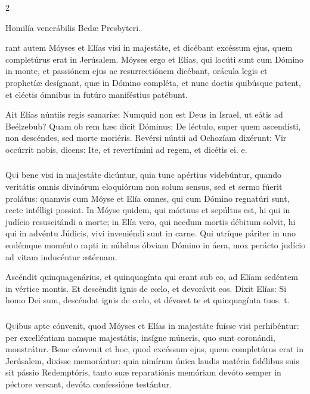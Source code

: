 \documentclass[9pt,twoside]{extarticle}
\begin{document}
\begin{multicols}{2}
\begin{center}Homilía venerábilis Bedæ Presbyteri.\end{center}
rant autem Móyses et Elías visi in majestáte, et dicébant excéssum ejus, quem completúrus erat in Jerúsalem. Móyses ergo et Elías, qui locúti sunt cum Dómino in monte, et passiónem ejus ac resurrectiónem dicébant, orácula legis et prophetíæ desígnant, quæ in Dómino compléta, et nunc doctis quibúsque patent, et eléctis ómnibus in futúro maniféstius patébunt.

\begin{tightlist}{}
\item {} Ait Elías núntiis regis samaríæ: Numquid non est Deus in Israel, ut eátis ad Beélzebub? Quam ob rem hæc dicit Dóminus: \textred{*} De léctulo, super quem ascendísti, non descéndes, sed morte moriéris.  Revérsi núntii ad Ochozíam dixérunt: Vir occúrrit nobis, dicens: Ite, et revertímini ad regem, et dicétis ei. e.
\end{tightlist}

\subsubsection*{\center {}}
\lettrine{Q}ui bene visi in majestáte dicúntur, quia tunc apértius videbúntur, quando veritátis omnis divinórum eloquiórum non solum sensus, sed et sermo fúerit prolátus: quamvis cum Móyse et Elía omnes, qui cum Dómino regnatúri sunt, recte intélligi possint. In Móyse quidem, qui mórtuus et sepúltus est, hi qui in judício resuscitándi a morte; in Elía vero, qui necdum mortis débitum solvit, hi qui in advéntu Júdicis, vivi inveniéndi sunt in carne. Qui utríque páriter in uno eodémque moménto rapti in núbibus óbviam Dómino in áera, mox perácto judício ad vitam inducéntur ætérnam.

\begin{tightlist}{}
\item {} Ascéndit quinquagenárius, et quinquagínta qui erant sub eo, ad Elíam sedéntem in vértice montis. \textred{*} Et descéndit ignis de cœlo, et devorávit eos.  Dixit Elías: Si homo Dei sum, descéndat ignis de cœlo, et dévoret te et quinquagínta tuos. t.
\end{tightlist}

\subsubsection*{\center {}}
\lettrine{Q}uibus apte cónvenit, quod Móyses et Elías in majestáte fuísse visi perhibéntur: per excelléntiam namque majestátis, insígne múneris, quo sunt coronándi, monstrátur. Bene cónvenit et hoc, quod excéssum ejus, quem completúrus erat in Jerúsalem, dixísse memorántur: quia nimírum única laudis matéria fidélibus suis sit pássio Redemptóris, tanto suæ reparatiónis memóriam devóto semper in péctore versant, devóta confessióne testántur.


\end{multicols}
\end{document}
